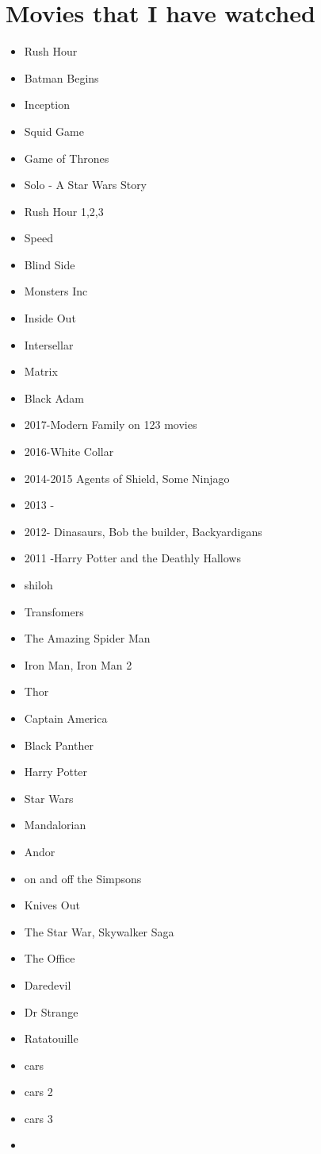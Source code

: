 \documentclass[11pt]{scrartcl}
\begin{document}
\section{Movies that I have watched}
\begin{itemize}
\item Rush Hour
\item Batman Begins
\item Inception
\item Squid Game
\item Game of Thrones
\item Solo - A Star Wars Story
\item Rush Hour 1,2,3
\item Speed
\item Blind Side
\item Monsters Inc
\item Inside Out
\item Intersellar
\item Matrix
\item Black Adam
\item 2017-Modern Family on 123 movies
\item 2016-White Collar
\item 2014-2015 Agents of Shield, Some Ninjago
\item 2013 -
\item 2012- Dinasaurs, Bob the builder, Backyardigans
\item 2011 -Harry Potter and the Deathly Hallows
\item shiloh
\item Transfomers
\item The Amazing Spider Man
\item Iron Man, Iron Man 2
\item Thor
\item Captain America
\item Black Panther
\item Harry Potter
\item Star Wars
\item Mandalorian
\item Andor
\item on and off the Simpsons
\item Knives Out
\item The Star War, Skywalker Saga
\item The Office
\item Daredevil
\item Dr Strange
\item Ratatouille
\item cars
\item cars 2
\item cars 3
\item 
\end{itemize}
\end{document}

